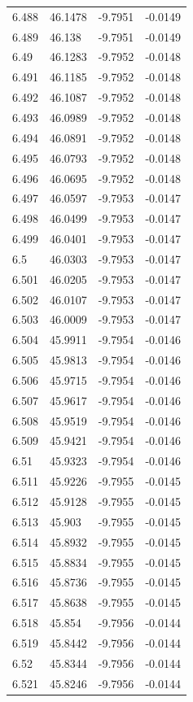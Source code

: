 \begin{tabular}{llll}
6.488 & 46.1478 & -9.7951 & -0.0149 \\
6.489 & 46.138 & -9.7951 & -0.0149 \\
6.49 & 46.1283 & -9.7952 & -0.0148 \\
6.491 & 46.1185 & -9.7952 & -0.0148 \\
6.492 & 46.1087 & -9.7952 & -0.0148 \\
6.493 & 46.0989 & -9.7952 & -0.0148 \\
6.494 & 46.0891 & -9.7952 & -0.0148 \\
6.495 & 46.0793 & -9.7952 & -0.0148 \\
6.496 & 46.0695 & -9.7952 & -0.0148 \\
6.497 & 46.0597 & -9.7953 & -0.0147 \\
6.498 & 46.0499 & -9.7953 & -0.0147 \\
6.499 & 46.0401 & -9.7953 & -0.0147 \\
6.5 & 46.0303 & -9.7953 & -0.0147 \\
6.501 & 46.0205 & -9.7953 & -0.0147 \\
6.502 & 46.0107 & -9.7953 & -0.0147 \\
6.503 & 46.0009 & -9.7953 & -0.0147 \\
6.504 & 45.9911 & -9.7954 & -0.0146 \\
6.505 & 45.9813 & -9.7954 & -0.0146 \\
6.506 & 45.9715 & -9.7954 & -0.0146 \\
6.507 & 45.9617 & -9.7954 & -0.0146 \\
6.508 & 45.9519 & -9.7954 & -0.0146 \\
6.509 & 45.9421 & -9.7954 & -0.0146 \\
6.51 & 45.9323 & -9.7954 & -0.0146 \\
6.511 & 45.9226 & -9.7955 & -0.0145 \\
6.512 & 45.9128 & -9.7955 & -0.0145 \\
6.513 & 45.903 & -9.7955 & -0.0145 \\
6.514 & 45.8932 & -9.7955 & -0.0145 \\
6.515 & 45.8834 & -9.7955 & -0.0145 \\
6.516 & 45.8736 & -9.7955 & -0.0145 \\
6.517 & 45.8638 & -9.7955 & -0.0145 \\
6.518 & 45.854 & -9.7956 & -0.0144 \\
6.519 & 45.8442 & -9.7956 & -0.0144 \\
6.52 & 45.8344 & -9.7956 & -0.0144 \\
6.521 & 45.8246 & -9.7956 & -0.0144 \\

\end{tabular}
